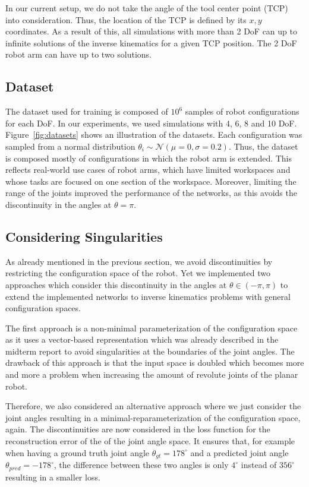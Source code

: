 \documentclass[conference]{IEEEtran}
\begin{document}
In our current setup, we do not take the angle of the tool center point (TCP) into consideration. Thus, the location of the TCP is defined by its \( x, y \) coordinates. As a result of this, all simulations with more than 2 DoF can up to infinite solutions of the inverse kinematics for a given TCP position. The 2 DoF robot arm can have up to two solutions.

\subsection*{Dataset}

The dataset used for training is composed of \( 10^6 \) samples of robot configurations for each DoF. In our experiments, we used simulations with 4, 6, 8 and 10 DoF. Figure~\ref{fig:datasets} shows an illustration of the datasets. Each configuration was sampled from a normal distribution \( \theta_i \sim \mathcal{N}(\mu=0, \sigma=0.2) \). Thus, the dataset is composed mostly of configurations in which the robot arm is extended. This reflects real-world use cases of robot arms, which have limited workspaces and whose tasks are focused on one section of the workspace. Moreover, limiting the range of the joints improved the performance of the networks, as this avoids the discontinuity in the angles at \( \theta = \pi \).


\subsection*{Considering Singularities}

As already mentioned in the previous section, we avoid discontinuities by restricting the configuration space of the robot. Yet we implemented two approaches which consider this discontinuity in the angles at $\theta \in (- \pi , \pi)$ to extend the implemented networks to inverse kinematics problems with general configuration spaces.

The first approach is a non-minimal parameterization of the configuration space as it uses a vector-based representation which was already described in the midterm report to avoid singularities at the boundaries of the joint angles. The drawback of this approach is that the input space is doubled which becomes more and more a problem when increasing the amount of revolute joints of the planar robot.

Therefore, we also considered an alternative approach where we just consider the joint angles resulting in a minimal-reparameterization of the configuration space, again. The discontinuities are now considered in the loss function for the reconstruction error of the of the joint angle space. It ensures that, for example when having a ground truth joint angle $\theta _{gt} = 178^\circ$ and a predicted joint angle $\theta _{pred} = -178^\circ$, the difference between these two angles is only $4^\circ$ instead of $356^\circ$ resulting in a smaller loss.
\end{document}
